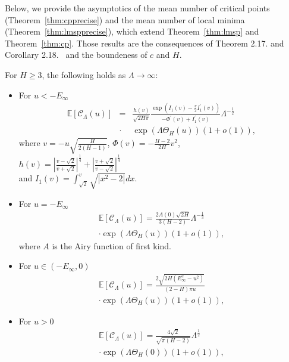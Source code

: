 \documentclass[twoside]{article}
\begin{document}
Below, we provide the asymptotics of the mean number of critical points (Theorem~\ref{thm:cpprecise}) and the mean number of local minima (Theorem~\ref{thm:lmspprecise}), which extend Theorem~\ref{thm:lmsp} and Theorem~\ref{thm:cp}. Those results are the consequences of Theorem 2.17. and Corollary 2.18.~\cite{AAC2010} and the boundeness of $c$ and $H$.
\begin{theorem}
For $H \geq 3$, the following holds as $\Lambda \rightarrow \infty$:
\begin{itemize}
\item For $u < -E_{\infty}$\\
\begin{eqnarray*}
\mathbb{E}[\mathcal{C}_{\Lambda}(u)] \!\!\!&=&\!\!\! \frac{h(v)}{\sqrt{2H\pi}}\frac{\exp(I_1(v) - \frac{v}{2}I_1^{'}(v))}{-\Phi^{'}(v) + I_1^{'}(v)}\Lambda^{-\frac{1}{2}}\\
&\cdot& \exp\left(\Lambda\Theta_H(u)\right)(1 + o(1)),
\end{eqnarray*}
where $v = -u\sqrt{\frac{H}{2(H-1)}}$, $\Phi(v) = -\frac{H-2}{2H}v^2$,\\
$h(v) = \left|\frac{v-\sqrt{2}}{v + \sqrt{2}}\right|^{\frac{1}{4}} + \left|\frac{v+\sqrt{2}}{v - \sqrt{2}}\right|^{\frac{1}{4}}$\\
and $I_1(v) = \int_{\sqrt{2}}^{v}\sqrt{|x^2 - 2|}dx$.
\item For $u = -E_{\infty}$\\
\begin{eqnarray*}
\mathbb{E}[\mathcal{C}_{\Lambda}(u)] = \frac{2A(0)\sqrt{2H}}{3(H-2)}\Lambda^{-\frac{1}{3}}\\
\cdot\exp\left(\Lambda\Theta_H(u)\right)(1 + o(1)),
\end{eqnarray*}
where $A$ is the Airy function of first kind.
\item For $u \in (-E_{\infty},0)$\\
\begin{eqnarray*}
\mathbb{E}[\mathcal{C}_{\Lambda}(u)] = \frac{2\sqrt{2H(E_{\infty}^2-u^2)}}{(2-H)\pi u}\\
\cdot\exp\left(\Lambda \Theta_H(u)\right)(1 + o(1)),
\end{eqnarray*}
\item For $u > 0$\\
\begin{eqnarray*}
\mathbb{E}[\mathcal{C}_{\Lambda}(u)] = \frac{4\sqrt{2}}{\sqrt{\pi(H-2)}}\Lambda^{\frac{1}{2}}\\
\cdot\exp\left(\Lambda\Theta_H(0)\right)(1 + o(1)),
\end{eqnarray*}
\end{itemize}
\label{thm:cpprecise}
\end{theorem}
\end{document}
